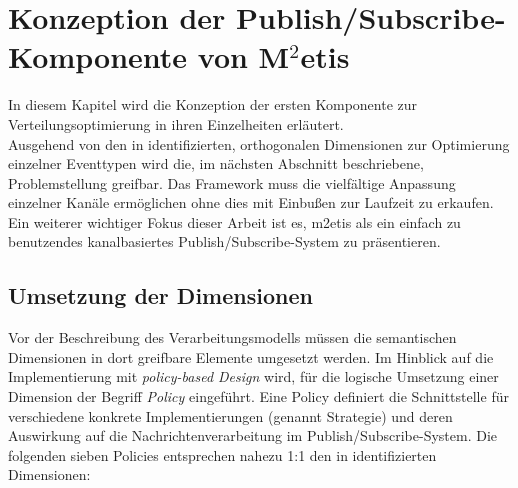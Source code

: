 \chapter[Konzeption der Publish/Subscribe-Komponente]{Konzeption der Publish/Subscribe-Komponente von M$^2$etis}
\label{chap:konzeption_pubsub}
In diesem Kapitel wird die Konzeption der ersten Komponente zur Verteilungsoptimierung in ihren Einzelheiten erläutert.\\
Ausgehend von den in  identifizierten, orthogonalen Dimensionen zur Optimierung einzelner Eventtypen wird die, im nächsten Abschnitt beschriebene, Problemstellung greifbar. Das Framework muss die vielfältige Anpassung einzelner Kanäle ermöglichen ohne dies mit Einbußen zur Laufzeit zu erkaufen. Ein weiterer wichtiger Fokus dieser Arbeit ist es, \ac{m2etis} als ein einfach zu benutzendes kanalbasiertes Publish/Subscribe-System zu präsentieren.




\section{Umsetzung der Dimensionen}
Vor der Beschreibung des Verarbeitungsmodells müssen die semantischen Dimensionen in dort greifbare Elemente umgesetzt werden. Im Hinblick auf die Implementierung mit \emph{policy-based Design} wird, für die logische Umsetzung einer Dimension der Begriff \emph{Policy} eingeführt. Eine Policy definiert die Schnittstelle für verschiedene konkrete Implementierungen (genannt Strategie) und deren Auswirkung auf die Nachrichtenverarbeitung im Publish/Subscribe-System. Die folgenden sieben Policies entsprechen nahezu 1:1 den in  identifizierten Dimensionen:

